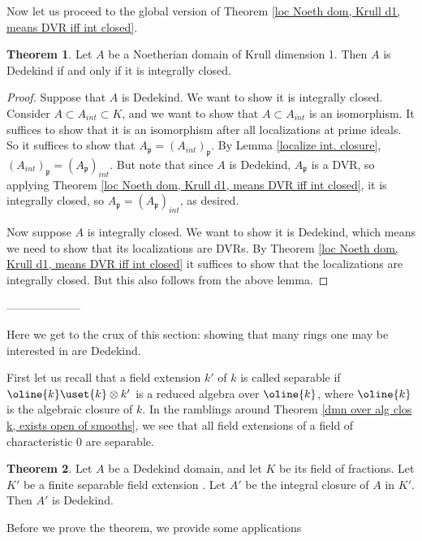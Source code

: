 \documentclass[12 pt]{article}
\theoremstyle{definition}
\newtheorem{thm}{Theorem}[section]
\renewcommand{\(}{\left(}
\renewcommand{\)}{\right)}
\newcommand\fp{{\mathfrak p}}
\begin{document}
Now let us proceed to the global version of Theorem \ref{loc Noeth dom, Krull d1, means DVR iff int closed}.

\begin{thm} Let $A$ be a Noetherian domain of Krull dimension 1. Then $A$ is Dedekind if and only if it is integrally closed.
\label{Noeth dom, Krull D1, then Dedekind iff int clos}
\end{thm}
\begin{proof} Suppose that $A$ is Dedekind. We want to show it is integrally closed. Consider $A \subset A_{int} \subset K$, and we want to show that $A \subset A_{int}$ is an isomorphism. It suffices to show that it is an isomorphism after all localizations at prime ideals. So it suffices to show that $A_\fp =(A_{int})_\fp$. By Lemma \ref{localize int. closure}, $(A_{int})_\fp=(A_\fp)_{int}$. But note that since $A$ is Dedekind, $A_\fp$ is a DVR, so applying Theorem \ref{loc Noeth dom, Krull d1, means DVR iff int closed}, it is integrally closed, so $A_\fp=(A_\fp)_{int}$, as desired.

Now suppose $A$ is integrally closed. We want to show it is Dedekind, which means we need to show that its localizations are DVRs. By Theorem \ref{loc Noeth dom, Krull d1, means DVR iff int closed} it suffices to show that the localizations are integrally closed. But this also follows from the above lemma.
\end{proof}

\centerline{--------------------}

Here we get to the crux of this section: showing that many rings one may be interested in are Dedekind. 

First let us recall that a field extension $k'$ of $k$ is called separable if $\oline{k} \uset{k}\otimes k'$ is a reduced algebra over $\oline{k}$, where $\oline{k}$ is the algebraic closure of $k$. In the ramblings around Theorem \ref{dmn over alg clos k, exists open of smooths}, we see that all field extensions of a field of characteristic 0 are separable.

\begin{thm} Let $A$ be a Dedekind domain, and let $K$ be its field of fractions. Let $K'$ be a finite separable field extension . Let $A'$ be the integral closure of $A$ in $K'$. Then $A'$ is Dedekind.
\label{ring of ints in field ext of Dedek is Dedek}
\end{thm}

Before we prove the theorem, we provide some applications
\end{document}
